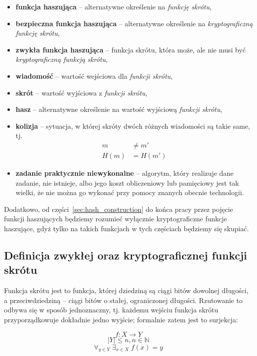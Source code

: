 \documentclass[12pt,a4paper,twoside]{article}
\begin{document}
\begin{itemize}
\item \textbf{funkcja haszująca} -- alternatywne określenie na \emph{funkcję
skrótu},
\item \textbf{bezpieczna funkcja haszująca} -- alternatywne określenie na
\emph{kryptograficzną funkcję skrótu},
\item \textbf{zwykła funkcja haszująca} -- funkcja skrótu, która może, ale nie
musi być \emph{kryptograficzną funkcją skrótu},
\item \textbf{wiadomość} -- wartość wejściowa dla \emph{funkcji skrótu},
\item \textbf{skrót} -- wartość wyjściowa z \emph{funkcji skrótu},
\item \textbf{hasz} -- alternatywne określenie na wartość wyjściową
\emph{funkcji skrótu},
\item \textbf{kolizja} -- sytuacja, w której skróty dwóch różnych wiadomości są
takie same, tj.
\[
    \begin{aligned}
    m &\neq m' \\
    H(m) &= H(m')
    \end{aligned}
\]
\item \textbf{zadanie praktycznie niewykonalne} -- algorytm, który realizuje
dane zadanie, nie istnieje, albo jego koszt obliczeniowy lub pamięciowy jest
tak wielki, że nie można go wykonać przy pomocy znanych obecnie technologii.
\end{itemize}

Dodatkowo, od części~\ref{sec:hash_construction} do końca pracy przez pojęcie
funkcji haszujących będziemy rozumieć wyłącznie kryptograficzne funkcje
haszujące, gdyż tylko na takich funkcjach w tych częściach będziemy się
skupiać.
\pagebreak



\subsection{Definicja zwykłej oraz kryptograficznej funkcji skrótu}

Funkcja skrótu jest to funkcja, której dziedziną są ciągi bitów dowolnej
długości, a przeciwdziedziną -- ciągi bitów o stałej, ograniczonej długości.
Rzutowanie to odbywa się w sposób jednoznaczny, tj. każdemu wejściu funkcja
skrótu przyporządkowuje dokładnie jedno wyjście; formalnie zatem jest to
surjekcja:

$$ f \colon X \to Y $$
$$ |Y| \leq n, n \in \mathbb{N} $$
$$ \forall_{y \in Y} \; \exists_{x \in X} \; f(x)=y $$
\end{document}
